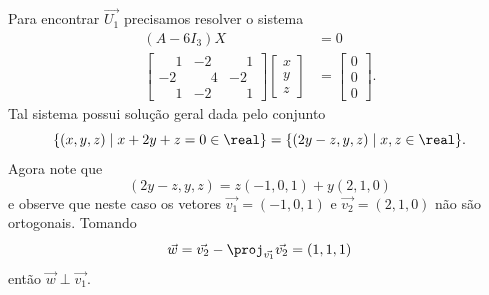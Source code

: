 \begin{exemplos}
\begin{enumerate}
\begin{solucao}
                  Para encontrar $\vec{U_1}$ precisamos resolver o sistema
                  \begin{align*}
                      (A - 6I_3)X                                   & = 0 \\
                      \begin{bmatrix}
                          \phantom{-}1 & -2           & \phantom{-}1 \\
                          -2           & \phantom{-}4 & -2           \\
                          \phantom{-}1 & -2           & \phantom{-}1
                      \end{bmatrix} \begin{bmatrix}
                                        x \\ y\\ z
                                    \end{bmatrix} & = \begin{bmatrix}
                                                          0 \\ 0\\ 0
                                                      \end{bmatrix}.
                  \end{align*}
                  Tal sistema possui solução geral dada pelo conjunto
                  \[
                      \{(x, y, z) \mid x + 2y + z = 0 \in \real\} = \{(2y - z, y, z) \mid x, z \in \real\}.
                  \]
                  Agora note que
                  \[
                      (2y - z, y, z) = z(-1, 0, 1) + y(2, 1, 0)
                  \]
                  e observe que neste caso os vetores $\vec{v_1} = (-1,0,1)$ e $\vec{v_2} = (2,1,0)$ não são ortogonais. Tomando
                  \[
                      \vec{w} = \vec{v_2} - \proj_{\vec{v_1}}\vec{v_2} = (1, 1, 1)
                  \]
                  então $\vec{w}\perp \vec{v_1}$.


\end{solucao}
\end{enumerate}
\end{exemplos}
